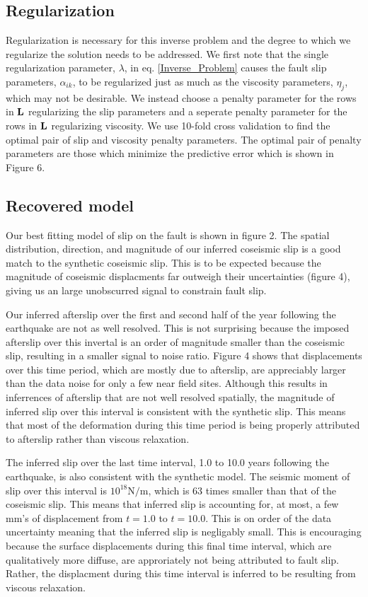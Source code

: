 \documentclass[12pt]{article}
\begin{document}
\subsection{Regularization}
Regularization is necessary for this inverse problem and the degree to
which we regularize the solution needs to be addressed.  We first
note that the single regularization parameter, $\lambda$, in
eq. \ref{Inverse_Problem} causes the fault slip parameters,
$\alpha_{ik}$, to be regularized just as much as the viscosity
parameters, $\eta_j$, which may not be desirable.  We instead choose a
penalty parameter for the rows in $\bold{L}$ regularizing the slip
parameters and a seperate penalty parameter for the rows in $\bold{L}$
regularizing viscosity.  We use 10-fold cross validation to find the
optimal pair of slip and viscosity penalty parameters. The optimal
pair of penalty parameters are those which minimize the predictive
error which is shown in Figure 6.  

\subsection{Recovered model}

Our best fitting model of slip on the fault is shown in figure 2.  The
spatial distribution, direction, and magnitude of our inferred
coseismic slip is a good match to the synthetic coseismic slip.  This
is to be expected because the magnitude of coseismic displacments far
outweigh their uncertainties (figure 4), giving us an large
unobscurred signal to constrain fault slip.  

Our inferred afterslip over the first and second half of the year
following the earthquake are not as well resolved.  This is not
surprising because the imposed afterslip over this invertal is an
order of magnitude smaller than the coseismic slip, resulting in a
smaller signal to noise ratio.  Figure 4 shows that displacements over
this time period, which are mostly due to afterslip, are appreciably
larger than the data noise for only a few near field sites.  Although
this results in inferrences of afterslip that are not well resolved
spatially, the magnitude of inferred slip over this interval is
consistent with the synthetic slip.  This means that most of the
deformation during this time period is being properly attributed to
afterslip rather than viscous relaxation.

The inferred slip over the last time interval, 1.0 to 10.0 years
following the earthquake, is also consistent with the synthetic model.
The seismic moment of slip over this interval is $10^{18}\mathrm{N}/\mathrm{m}$,
which is 63 times smaller than that of the coseismic slip.  This
means that inferred slip is accounting for, at most, a few mm's of
displacement from $t=1.0$ to $t=10.0$.  This is on order of the data
uncertainty meaning that the inferred slip is negligably small.  This
is encouraging because the surface displacements during this final
time interval, which are qualitatively more diffuse, are approriately
not being attributed to fault slip.  Rather, the displacment during
this time interval is inferred to be resulting from viscous
relaxation.
\end{document}
